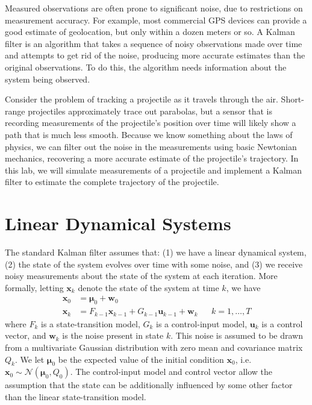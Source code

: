 \labdependencies{}

Measured observations are often prone to significant noise, due to restrictions on measurement accuracy.
For example, most commercial GPS devices can provide a good estimate of geolocation, but only within a dozen meters or so.
A Kalman filter is an algorithm that takes a sequence of noisy observations made over time and attempts to get rid of the noise, producing more accurate estimates than the original observations.
To do this, the algorithm needs information about the system being observed.

Consider the problem of tracking a projectile as it travels through the air.
Short-range projectiles approximately trace out parabolas, but a sensor that is recording measurements of the projectile's position over time will likely show a path that is much less smooth.
Because we know something about the laws of physics, we can filter out the noise in the measurements using basic Newtonian mechanics, recovering a more accurate estimate of the projectile's trajectory.
In this lab, we will simulate measurements of a projectile and implement a Kalman filter to estimate the complete trajectory of the projectile.

\section*{Linear Dynamical Systems}
The standard Kalman filter assumes that:
(1) we have a linear dynamical system,
(2) the state of the system evolves over time with some noise, and
(3) we receive noisy measurements about the state of the system at each iteration.
More formally, letting $\mathbf{x}_{k}$ denote the state of the system at time $k$, we have
\begin{align}
    \mathbf{x}_0 &= \boldsymbol \mu_0 + \mathbf{w}_0 \\
    \mathbf{x}_k &= F_{k-1} \mathbf{x}_{k-1} + G_{k-1}\mathbf{u}_{k-1} + \mathbf{w}_{k} && k = 1, \dots, T
    \label{eq:state}
\end{align}
where $F_{k}$ is a state-transition model, $G_{k}$ is a control-input model, $\mathbf{u}_{k}$ is a control vector, and $\mathbf{w}_{k}$ is the noise present in state $k$.
This noise is assumed to be drawn from a multivariate Gaussian distribution with zero mean and covariance matrix $Q_{k}$.
We let $\boldsymbol \mu_0$ be the expected value of the initial condition $\mathbf{x}_0$, i.e. $\mathbf{x}_0 \sim \mathcal{N}(\boldsymbol \mu_0, Q_0)$.
The control-input model and control vector allow the assumption that the state can be additionally influenced by some other factor than the linear state-transition model.

